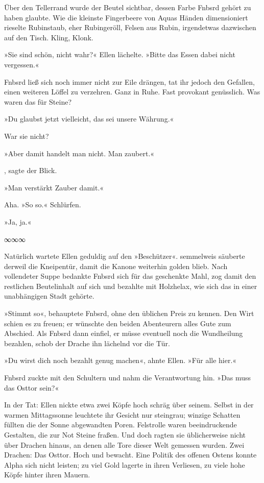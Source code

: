 Über den Tellerrand wurde der Beutel sichtbar, dessen Farbe Fnbsrd gehört zu haben glaubte. Wie die kleinste Fingerbeere von Aquas Händen dimensioniert rieselte Rubinstaub, eher Rubingeröll, Felsen aus Rubin, irgendetwas dazwischen auf den Tisch. Kling, Klonk.

»Sie sind schön, nicht wahr?« Ellen lächelte. »Bitte das Essen dabei nicht vergessen.«

Fnbsrd ließ sich noch immer nicht zur Eile drängen, tat ihr jedoch den Gefallen, einen weiteren Löffel zu verzehren. Ganz in Ruhe. Fast provokant genüsslich. Was waren das für Steine?

»Du glaubst jetzt vielleicht, das sei unsere Währung.«

War sie nicht?

»Aber damit handelt man nicht. Man zaubert.«

, sagte der Blick.

»Man verstärkt Zauber damit.«

Aha. »So so.« Schlürfen.

»Ja, ja.«

\begin{center}
∞∞∞
\end{center}

Natürlich wartete Ellen geduldig auf den »Beschützer«. semmelweis säuberte derweil die Kneipentür, damit die Kanone weiterhin golden blieb. Nach vollendeter Suppe bedankte Fnbsrd sich für das geschenkte Mahl, zog damit den restlichen Beutelinhalt auf sich und bezahlte mit Holzhelax, wie sich das in einer unabhängigen Stadt gehörte.

»Stimmt so«, behauptete Fnbsrd, ohne den üblichen Preis zu kennen. Den Wirt schien es zu freuen; er wünschte den beiden Abenteurern alles Gute zum Abschied. Als Fnbsrd dann einfiel, er müsse eventuell noch die Wundheilung bezahlen, schob der Drache ihn lächelnd vor die Tür.

»Du wirst dich noch bezahlt genug machen«, ahnte Ellen. »Für alle hier.«

Fnbsrd zuckte mit den Schultern und nahm die Verantwortung hin. »Das muss das Osttor sein?«

In der Tat: Ellen nickte etwa zwei Köpfe hoch schräg über seinem. Selbst in der warmen Mittagssonne leuchtete ihr Gesicht nur steingrau; winzige Schatten füllten die der Sonne abgewandten Poren. Felstrolle waren beeindruckende Gestalten, die zur Not Steine fraßen. Und doch ragten sie üblicherweise nicht über Drachen hinaus, an denen alle Tore dieser Welt gemessen wurden. Zwei Drachen: Das Osttor. Hoch und bewacht. Eine Politik des offenen Ostens konnte Alpha sich nicht leisten; zu viel Gold lagerte in ihren Verliesen, zu viele hohe Köpfe hinter ihren Mauern.


